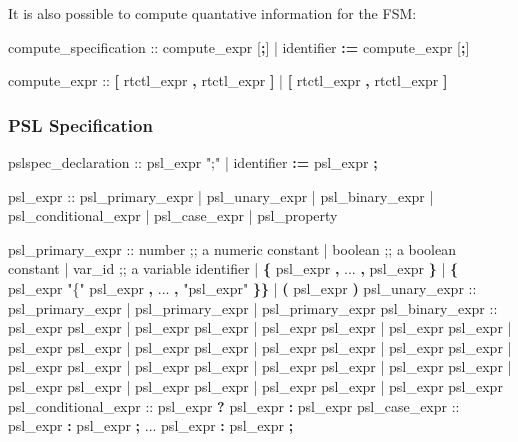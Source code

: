 It is also possible to compute quantative information for the FSM:

\begin{Grammar}
compute_specification ::  compute_expr [\textbf{;}]
                       |   identifier \textbf{:=} compute_expr [\textbf{;}]
\end{Grammar}

\begin{Grammar}
compute_expr ::  \textbf{[} rtctl_expr \textbf{,} rtctl_expr \textbf{]}
              |  \textbf{[} rtctl_expr \textbf{,} rtctl_expr \textbf{]}
\end{Grammar}


\subsubsection{PSL Specification}
%
\begin{Grammar}
pslspec_declaration ::  psl_expr ";"
                     |   identifier \textbf{:=} psl_expr \textbf{;}
\end{Grammar}
%
\begin{Grammar}
psl_expr ::
   psl_primary_expr
 | psl_unary_expr
 | psl_binary_expr
 | psl_conditional_expr
 | psl_case_expr
 | psl_property
\end{Grammar}
%
\begin{Grammar}
psl_primary_expr ::
   number                              ;; a numeric constant
 | boolean                             ;; a boolean constant
 | var_id                              ;; a variable identifier
 | \textbf{\{} psl_expr \textbf{,} ... \textbf{,} psl_expr \textbf{\}}
 | \textbf{\{} psl_expr "\{" psl_expr \textbf{,} ... \textbf{,} "psl_expr" \textbf{\}}\textbf{\}}
 | \textbf{(} psl_expr \textbf{)}
psl_unary_expr ::
   \operator{+} psl_primary_expr     
 | \operator{-} psl_primary_expr  
 | \operator{!} psl_primary_expr  
psl_binary_expr ::
   psl_expr \operator{+} psl_expr    
 | psl_expr  psl_expr 
 | psl_expr  psl_expr 
 | psl_expr \operator{-} psl_expr   
 | psl_expr \operator{*}psl_expr   
 | psl_expr \operator{/} psl_expr   
 | psl_expr \operator{\%} psl_expr 
 | psl_expr \operator{==} psl_expr    
 | psl_expr \operator{!=} psl_expr  
 | psl_expr \operator{<} psl_expr       
 | psl_expr \operator{<=} psl_expr       
 | psl_expr \operator{>} psl_expr       
 | psl_expr \operator{>=} psl_expr       
 | psl_expr \operator{&} psl_expr 
 | psl_expr \operator{|} psl_expr 
 | psl_expr  psl_expr 
psl_conditional_expr ::
 psl_expr \textbf{?} psl_expr \textbf{:} psl_expr 
psl_case_expr ::
     psl_expr \textbf{:} psl_expr \textbf{;}
     ...
     psl_expr \textbf{:} psl_expr \textbf{;}
\end{Grammar}
